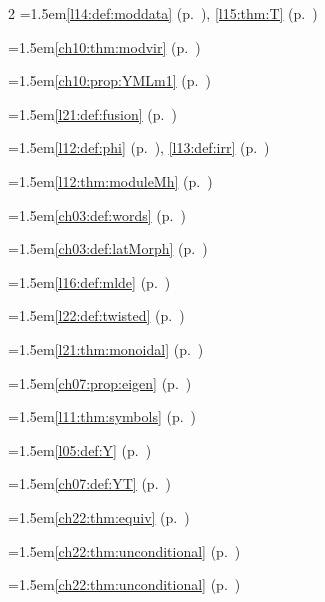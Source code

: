 \begin{multicols}{2}
\hangindent=1.5em\quad \ref{l14:def:moddata} (p.~\pageref{l14:def:moddata}), \ref{l15:thm:T} (p.~\pageref{l15:thm:T})\par
\hangindent=1.5em\quad \ref{ch10:thm:modvir} (p.~\pageref{ch10:thm:modvir})\par
\hangindent=1.5em\quad \ref{ch10:prop:YMLm1} (p.~\pageref{ch10:prop:YMLm1})\par
\hangindent=1.5em\quad \ref{l21:def:fusion} (p.~\pageref{l21:def:fusion})\par
\hangindent=1.5em\quad \ref{l12:def:phi} (p.~\pageref{l12:def:phi}), \ref{l13:def:irr} (p.~\pageref{l13:def:irr})\par
\hangindent=1.5em\quad \ref{l12:thm:moduleMh} (p.~\pageref{l12:thm:moduleMh})\par
\hangindent=1.5em\quad \ref{ch03:def:words} (p.~\pageref{ch03:def:words})\par
\hangindent=1.5em\quad \ref{ch03:def:latMorph} (p.~\pageref{ch03:def:latMorph})\par
\hangindent=1.5em\quad \ref{l16:def:mlde} (p.~\pageref{l16:def:mlde})\par
\hangindent=1.5em\quad \ref{l22:def:twisted} (p.~\pageref{l22:def:twisted})\par
\hangindent=1.5em\quad \ref{l21:thm:monoidal} (p.~\pageref{l21:thm:monoidal})\par
\hangindent=1.5em\quad \ref{ch07:prop:eigen} (p.~\pageref{ch07:prop:eigen})\par
\hangindent=1.5em\quad \ref{l11:thm:symbols} (p.~\pageref{l11:thm:symbols})\par
\hangindent=1.5em\quad \ref{l05:def:Y} (p.~\pageref{l05:def:Y})\par
\hangindent=1.5em\quad \ref{ch07:def:YT} (p.~\pageref{ch07:def:YT})\par
\hangindent=1.5em\quad \ref{ch22:thm:equiv} (p.~\pageref{ch22:thm:equiv})\par
\hangindent=1.5em\quad \ref{ch22:thm:unconditional} (p.~\pageref{ch22:thm:unconditional})\par
\hangindent=1.5em\quad \ref{ch22:thm:unconditional} (p.~\pageref{ch22:thm:unconditional})\par

\end{multicols}
